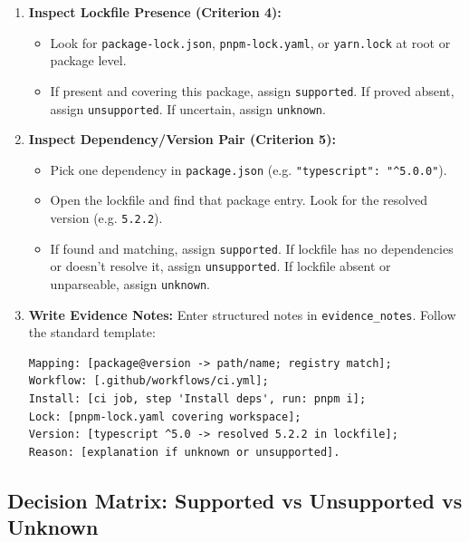 \documentclass[11pt,a4paper]{article}
\begin{document}
\begin{enumerate}
\begin{itemize}
  \end{itemize}
  \item \textbf{Inspect Lockfile Presence (Criterion 4):}
  \begin{itemize}
    \item Look for \nolinkurl{package-lock.json}, \nolinkurl{pnpm-lock.yaml}, or \nolinkurl{yarn.lock} at root or package level.
    \item If present and covering this package, assign \nolinkurl{supported}. If proved absent, assign \nolinkurl{unsupported}. If uncertain, assign \nolinkurl{unknown}.
  \end{itemize}
  \item \textbf{Inspect Dependency/Version Pair (Criterion 5):}
  \begin{itemize}
    \item Pick one dependency in \nolinkurl{package.json} (e.g. \nolinkurl{"typescript": "^5.0.0"}).
    \item Open the lockfile and find that package entry. Look for the resolved version (e.g. \nolinkurl{5.2.2}).
    \item If found and matching, assign \nolinkurl{supported}. If lockfile has no dependencies or doesn't resolve it, assign \nolinkurl{unsupported}. If lockfile absent or unparseable, assign \nolinkurl{unknown}.
  \end{itemize}
  \item \textbf{Write Evidence Notes:} Enter structured notes in \nolinkurl{evidence_notes}. Follow the standard template:
\begin{lstlisting}
Mapping: [package@version -> path/name; registry match];
Workflow: [.github/workflows/ci.yml];
Install: [ci job, step 'Install deps', run: pnpm i];
Lock: [pnpm-lock.yaml covering workspace];
Version: [typescript ^5.0 -> resolved 5.2.2 in lockfile];
Reason: [explanation if unknown or unsupported].
\end{lstlisting}
\end{enumerate}

\subsection{Decision Matrix: Supported vs Unsupported vs Unknown}
\end{document}
